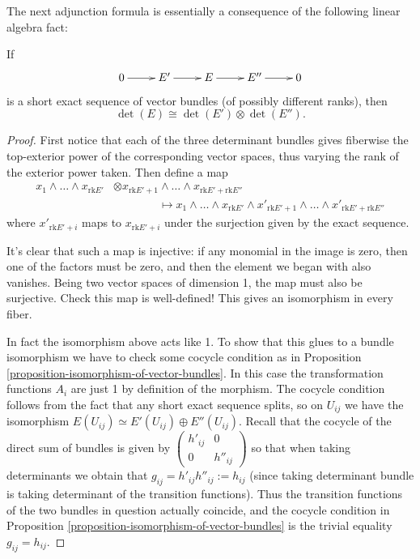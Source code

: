 \noindent
The next adjunction formula is essentially a consequence
of the following linear algebra fact:

\begin{lemma}
\label{lemma-detrminant-of-ses}
If
$$
\xymatrix{
0\ar[r]
&E'\ar[r]
&E\ar[r]
&E''\ar[r]
&0
}
$$
is a short exact sequence of vector bundles
(of possibly different ranks),
then
$$
\det(E)\cong \det(E')\otimes \det(E'').
$$
\end{lemma}

\begin{proof}
First notice that each of the three
determinant bundles gives fiberwise the top-exterior
power of the corresponding vector spaces,
thus varying the rank of the exterior power taken.
Then define a map
\begin{align*}
x_1 \wedge…\wedge x_{\text{rk}E'}
&\otimes x_{\text{rk}E'+1}\wedge…\wedge x_{\text{rk}E'+\text{rk}E''}\\
&\qquad \qquad \mapsto x_1 \wedge…\wedge x_{\text{rk}E'}
\wedge x'_{\text{rk}E'+1}\wedge…\wedge x'_{\text{rk}E'+\text{rk}E''}
\end{align*}
where $x'_{\text{rk}E'+i}$ maps to $x_{\text{rk}E'+i}$ 
under the surjection given by the exact sequence.

It's clear that such a map is injective:
if any monomial in the image is zero, then one of the
factors must be zero, and then the element
we began with also vanishes.
Being two vector spaces of dimension 1,
the map must also be surjective.
Check this map is well-defined!
This gives an isomorphism in every fiber.

In fact the isomorphism above acts like 1.
To show that this glues to a bundle isomorphism
we have to check some cocycle condition
as in Proposition \ref{proposition-isomorphism-of-vector-bundles}.
In this case the transformation functions $A_i$ 
are just 1 by definition of the morphism.
The cocycle condition follows from the fact that
any short exact sequence splits,
so on $U_{ij}$ we have the isomorphism
$E(U_{ij}) \simeq E'(U_{ij})\oplus E''(U_{ij})$.
Recall that the cocycle of the direct sum of
bundles is given by $\begin{pmatrix}h'_{ij}&0\\ 0&h''_{ij}\end{pmatrix}$ 
so that when taking determinants
we obtain that $g_{ij}=h'_{ij}h''_{ij}:=h_{ij}$
(since taking determinant bundle is taking determinant of
the transition functions).
Thus the transition functions of the two bundles in question
actually coincide,
and the cocycle condition in Proposition
\ref{proposition-isomorphism-of-vector-bundles}
is the trivial equality $g_{ij}=h_{ij}$.
\end{proof}

